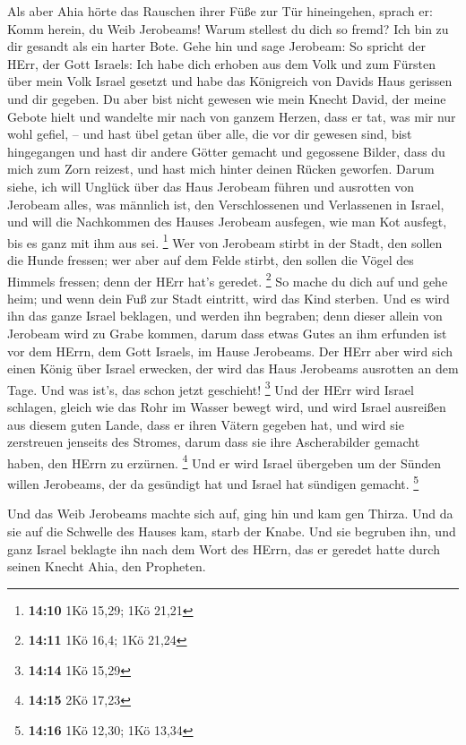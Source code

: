 Als aber Ahia hörte das Rauschen ihrer Füße zur Tür
hineingehen, sprach er: Komm herein, du Weib Jerobeams! Warum stellest
du dich so fremd? Ich bin zu dir gesandt als ein harter Bote.
 Gehe hin und sage Jerobeam: So spricht der HErr, der Gott
Israels: Ich habe dich erhoben aus dem Volk und zum Fürsten über mein
Volk Israel gesetzt  und habe das Königreich von Davids Haus
gerissen und dir gegeben. Du aber bist nicht gewesen wie mein Knecht
David, der meine Gebote hielt und wandelte mir nach von ganzem Herzen,
dass er tat, was mir nur wohl gefiel, --  und hast übel
getan über alle, die vor dir gewesen sind, bist hingegangen und hast dir
andere Götter gemacht und gegossene Bilder, dass du mich zum Zorn
reizest, und hast mich hinter deinen Rücken geworfen. 
Darum siehe, ich will Unglück über das Haus Jerobeam führen und
ausrotten von Jerobeam alles, was männlich ist, den Verschlossenen und
Verlassenen in Israel, und will die Nachkommen des Hauses Jerobeam
ausfegen, wie man Kot ausfegt, bis es ganz mit ihm aus sei. \footnote{\textbf{14:10}
  1Kö 15,29; 1Kö 21,21}  Wer von Jerobeam stirbt in der
Stadt, den sollen die Hunde fressen; wer aber auf dem Felde stirbt, den
sollen die Vögel des Himmels fressen; denn der HErr hat's geredet.
\footnote{\textbf{14:11} 1Kö 16,4; 1Kö 21,24}  So mache du
dich auf und gehe heim; und wenn dein Fuß zur Stadt eintritt, wird das
Kind sterben.  Und es wird ihn das ganze Israel beklagen,
und werden ihn begraben; denn dieser allein von Jerobeam wird zu Grabe
kommen, darum dass etwas Gutes an ihm erfunden ist vor dem HErrn, dem
Gott Israels, im Hause Jerobeams.  Der HErr aber wird sich
einen König über Israel erwecken, der wird das Haus Jerobeams ausrotten
an dem Tage. Und was ist's, das schon jetzt geschieht! \footnote{\textbf{14:14}
  1Kö 15,29}  Und der HErr wird Israel schlagen, gleich wie
das Rohr im Wasser bewegt wird, und wird Israel ausreißen aus diesem
guten Lande, dass er ihren Vätern gegeben hat, und wird sie zerstreuen
jenseits des Stromes, darum dass sie ihre Ascherabilder gemacht haben,
den HErrn zu erzürnen. \footnote{\textbf{14:15} 2Kö 17,23} 
Und er wird Israel übergeben um der Sünden willen Jerobeams, der da
gesündigt hat und Israel hat sündigen gemacht. \footnote{\textbf{14:16}
  1Kö 12,30; 1Kö 13,34}

 Und das Weib Jerobeams machte sich auf, ging hin und kam
gen Thirza. Und da sie auf die Schwelle des Hauses kam, starb der Knabe.
 Und sie begruben ihn, und ganz Israel beklagte ihn nach
dem Wort des HErrn, das er geredet hatte durch seinen Knecht Ahia, den
Propheten.

